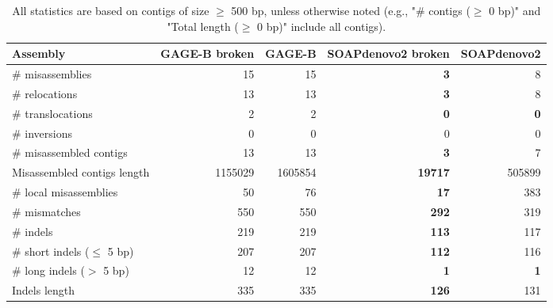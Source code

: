 \documentclass[12pt,a4paper]{article}
\begin{document}
\begin{table}[ht]
\begin{center}
\caption{All statistics are based on contigs of size $\geq$ 500 bp, unless otherwise noted (e.g., "\# contigs ($\geq$ 0 bp)" and "Total length ($\geq$ 0 bp)" include all contigs).}
\begin{tabular}{|l*{4}{|r}|}
\hline
Assembly & GAGE-B broken & GAGE-B & SOAPdenovo2 broken & SOAPdenovo2 \\ \hline
\# misassemblies & 15 & 15 & {\bf 3} & 8 \\ \hline
\hspace{5mm}\# relocations & 13 & 13 & {\bf 3} & 8 \\ \hline
\hspace{5mm}\# translocations & 2 & 2 & {\bf 0} & {\bf 0} \\ \hline
\hspace{5mm}\# inversions & 0 & 0 & 0 & 0 \\ \hline
\# misassembled contigs & 13 & 13 & {\bf 3} & 7 \\ \hline
Misassembled contigs length & 1155029 & 1605854 & {\bf 19717} & 505899 \\ \hline
\# local misassemblies & 50 & 76 & {\bf 17} & 383 \\ \hline
\# mismatches & 550 & 550 & {\bf 292} & 319 \\ \hline
\# indels & 219 & 219 & {\bf 113} & 117 \\ \hline
\hspace{5mm}\# short indels ($\leq$ 5 bp) & 207 & 207 & {\bf 112} & 116 \\ \hline
\hspace{5mm}\# long indels ($>$ 5 bp) & 12 & 12 & {\bf 1} & {\bf 1} \\ \hline
Indels length & 335 & 335 & {\bf 126} & 131 \\ \hline
\end{tabular}
\end{center}
\end{table}
\end{document}
